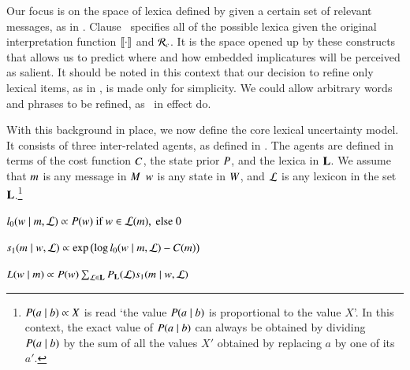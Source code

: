 \documentclass[leqno,12pt]{article}
\begin{document}
Our focus is on the space of lexica defined by
 given a certain set of relevant messages,
as in . Clause~
specifies all of the possible lexica given the original interpretation
function $\llbracket\cdot\rrbracket$ and $\mathcal{R}_{c}$. It is the space opened up by
these constructs that allows us to predict where and how embedded
implicatures will be perceived as salient. It should be noted in this
context that our decision to refine only lexical items, as in
, is made only for simplicity. We could
allow arbitrary words and phrases to be refined, as \CFS\ in effect
do.


With this background in place, we now define the core lexical
uncertainty model. It consists of three inter-related agents, as
defined in . The agents are defined in terms of the cost
function $C$, the state prior $P$, and the lexica in
$\mathbf{L}$. We assume that $m$ is any message in $M$
$w$ is any state in $W$, and $\mathcal{L}$ is any lexicon in the
set $\mathbf{L}$.\footnote{$P(a \mid b) \propto X$ is read `the value
  $P(a \mid b)$ is proportional to the value $X$'. In this context,
  the exact value of $P(a \mid b)$ can always be obtained by
  dividing $P(a \mid b)$ by the sum of all the values $X'$ obtained
  by replacing $a$ by one of its $a'$.}
%
\begin{examples}
\item\label{agents}
  \begin{examples}
  \item\label{l0}%
    $l_{0}(w \mid m, \mathcal{L}) \propto P(w) \text{ if } w \in \mathcal{L}(m), \text{ else } 0$

  \item\label{s1}%
    $s_{1}(m \mid w, \mathcal{L}) \propto
    \exp
    \left(
      \log l_{0}(w \mid m, \mathcal{L})
      - 
      C(m)
    \right)$
    
  \item\label{L} 
    $L(w \mid m) 
    \propto 
    P(w)
    \sum_{\mathcal{L} \in \mathbf{L}}
    P_{\mathbf{L}}(\mathcal{L})
    s_{1}(m \mid w, \mathcal{L})$
  \end{examples}
\end{examples}
\end{document}
